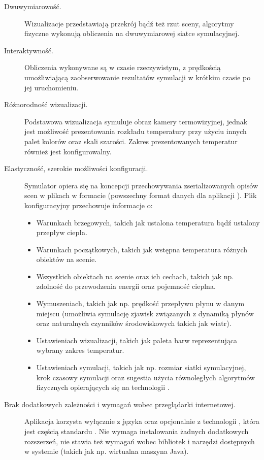 \begin{description}

\item[Dwuwymiarowość.] Wizualizacje przedstawiają przekrój bądź też rzut sceny,
algorytmy fizyczne wykonują obliczenia na dwuwymiarowej siatce symulacyjnej.

\item[Interaktywność.] Obliczenia wykonywane są w czasie rzeczywistym,
z prędkością umożliwiającą zaobserwowanie rezultatów symulacji w krótkim
czasie po jej uruchomieniu.  

\item[Różnorodność wizualizacji.] Podstawowa wizualizacja symuluje obraz
kamery termowizyjnej, jednak jest możliwość prezentowania rozkładu temperatury
przy użyciu innych palet kolorów oraz skali szarości. Zakres prezentowanych
temperatur również jest konfigurowalny.

\item[Elastyczność, szerokie możliwości konfiguracji.] Symulator opiera się na
koncepcji przechowywania zserializowanych opisów scen w plikach w formacie
 (powszechny format danych dla aplikacji \js). Plik konfiguracyjny
przechowuje informacje o:
\begin{itemize}

\item Warunkach brzegowych, takich jak ustalona temperatura bądź ustalony
przepływ ciepła.

\item Warunkach początkowych, takich jak wstępna temperatura różnych obiektów
na scenie.

\item Wszystkich obiektach na scenie oraz ich cechach, takich jak np. zdolność
do przewodzenia energii oraz pojemność cieplna.

\item Wymuszeniach, takich jak np. prędkość przepływu płynu w danym miejscu
(umożliwia symulację zjawisk związanych z dynamiką płynów oraz naturalnych
czynników środowiskowych takich jak wiatr).

\item Ustawieniach wizualizacji, takich jak paleta barw reprezentująca
wybrany zakres temperatur.

\item Ustawieniach symulacji, takich jak np. rozmiar siatki symulacyjnej, krok
czasowy symulacji oraz sugestia użycia równoległych algorytmów fizycznych
opierających się na technologii .

\end{itemize} 

\item[Brak dodatkowych zależności i wymagań wobec przeglądarki internetowej.]
Aplikacja korzysta wyłącznie z języka \js oraz opcjonalnie z technologii
, która jest częścią standardu . Nie wymaga instalowania
żadnych dodatkowych rozszerzeń, nie stawia też wymagań wobec bibliotek i
narzędzi dostępnych w systemie (takich jak np. wirtualna maszyna Java).

\end{description}

